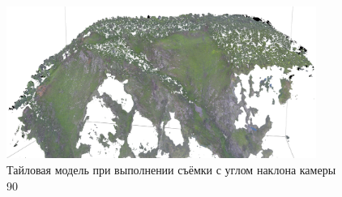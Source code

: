 \begin{figure}[h!]
  \begin{center}
    \includegraphics[width=0.9\textwidth]{authors/efremov-fig1.png}
  \end{center}
  \caption{Тайловая модель при выполнении съёмки с углом наклона камеры 90\dg}
  \label{fig:efremov-fig1}
\end{figure}
